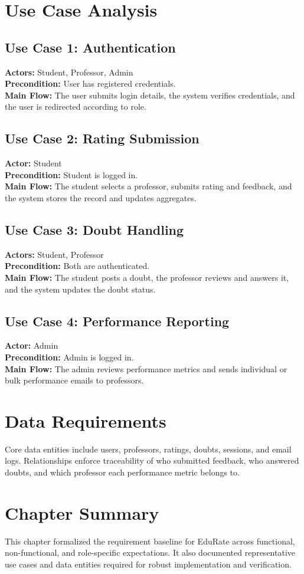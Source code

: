 \section{Use Case Analysis}
\subsection*{Use Case 1: Authentication}
\textbf{Actors:} Student, Professor, Admin\\
\textbf{Precondition:} User has registered credentials.\\
\textbf{Main Flow:} The user submits login details, the system verifies credentials, and the user is redirected according to role.

\subsection*{Use Case 2: Rating Submission}
\textbf{Actor:} Student\\
\textbf{Precondition:} Student is logged in.\\
\textbf{Main Flow:} The student selects a professor, submits rating and feedback, and the system stores the record and updates aggregates.

\subsection*{Use Case 3: Doubt Handling}
\textbf{Actors:} Student, Professor\\
\textbf{Precondition:} Both are authenticated.\\
\textbf{Main Flow:} The student posts a doubt, the professor reviews and answers it, and the system updates the doubt status.

\subsection*{Use Case 4: Performance Reporting}
\textbf{Actor:} Admin\\
\textbf{Precondition:} Admin is logged in.\\
\textbf{Main Flow:} The admin reviews performance metrics and sends individual or bulk performance emails to professors.

\section{Data Requirements}
Core data entities include users, professors, ratings, doubts, sessions, and email logs. Relationships enforce traceability of who submitted feedback, who answered doubts, and which professor each performance metric belongs to.

\section*{Chapter Summary}
This chapter formalized the requirement baseline for EduRate across functional, non-functional, and role-specific expectations. It also documented representative use cases and data entities required for robust implementation and verification.
